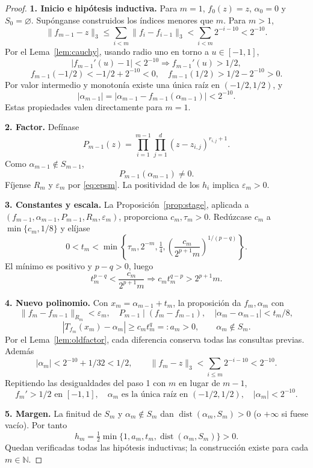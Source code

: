 \documentclass[11pt,a4paper]{article}
\numberwithin{equation}{section}
\theoremstyle{definition}
\theoremstyle{remark}
\newcommand{\N}{\mathbb N}
\DeclareMathOperator{\dist}{dist}
\newcommand{\paso}[1]{\par\smallskip\noindent\textbf{#1}\quad}
\begin{document}
\begin{proof}
\paso{1. Inicio e hipótesis inductiva.}
Para $m=1$, $f_0(z)=z$, $\alpha_0=0$ y $S_0=\varnothing$. Supónganse construidos los índices menores que $m$. Para $m>1$,
\[
\|f_{m-1}-z\|_3\le\sum_{i<m}\|f_i-f_{i-1}\|_3
<\sum_{i<m}2^{-i-10}<2^{-10}.
\]
Por el Lema~\ref{lem:cauchy}, usando radio uno en torno a $u\in[-1,1]$,
\[
|f_{m-1}'(u)-1|<2^{-10}\Longrightarrow f_{m-1}'(u)>1/2,
\]
\[
f_{m-1}(-1/2)<-1/2+2^{-10}<0,
\quad f_{m-1}(1/2)>1/2-2^{-10}>0.
\]
Por valor intermedio y monotonía existe una única raíz en $(-1/2,1/2)$, y
\[
|\alpha_{m-1}|=|\alpha_{m-1}-f_{m-1}(\alpha_{m-1})|<2^{-10}.
\]
Estas propiedades valen directamente para $m=1$.
\paso{2. Factor.}
Defínase
\begin{equation}\label{eq:Pm}
P_{m-1}(z)=\prod_{i=1}^{m-1}\prod_{j=1}^d(z-z_{i,j})^{r_{i,j}+1}.
\end{equation}
Como $\alpha_{m-1}\notin S_{m-1}$,
\[
P_{m-1}(\alpha_{m-1})\ne0.
\]
Fíjense $R_m$ y $\varepsilon_m$ por \eqref{eq:epsm}. La positividad de los $h_i$ implica $\varepsilon_m>0$.
\paso{3. Constantes y escala.}
La Proposición~\ref{prop:stage}, aplicada a $(f_{m-1},\alpha_{m-1},P_{m-1},R_m,\varepsilon_m)$, proporciona $c_m,\tau_m>0$. Redúzcase $c_m$ a $\min\{c_m,1/8\}$ y elíjase
\begin{equation}\label{eq:choose-tm}
0<t_m<\min\left\{\tau_m,2^{-m},\tfrac14,
\left(\frac{c_m}{2^{p+1}m}\right)^{1/(p-q)}\right\}.
\end{equation}
El mínimo es positivo y $p-q>0$, luego
\[
t_m^{p-q}<\frac{c_m}{2^{p+1}m}
\Longrightarrow c_mt_m^{q-p}>2^{p+1}m.
\]
\paso{4. Nuevo polinomio.}
Con $x_m=\alpha_{m-1}+t_m$, la proposición da $f_m,\alpha_m$ con
\[
\|f_m-f_{m-1}\|_{R_m}<\varepsilon_m,\quad
P_{m-1}\mid(f_m-f_{m-1}),\quad
|\alpha_m-\alpha_{m-1}|<t_m/8,
\]
\[
|T_{f_m}(x_m)-\alpha_m|\ge c_mt_m^q=:a_m>0,
\qquad \alpha_m\notin S_m.
\]
Por el Lema~\ref{lem:oldfactor}, cada diferencia conserva todas las consultas previas. Además
\[
|\alpha_m|<2^{-10}+1/32<1/2,\qquad
\|f_m-z\|_3<\sum_{i\le m}2^{-i-10}<2^{-10}.
\]
Repitiendo las desigualdades del paso 1 con $m$ en lugar de $m-1$,
\[
f_m'>1/2\text{ en }[-1,1],\quad
\alpha_m\text{ es la única raíz en }(-1/2,1/2),\quad |\alpha_m|<2^{-10}.
\]
\paso{5. Margen.}
La finitud de $S_m$ y $\alpha_m\notin S_m$ dan $\dist(\alpha_m,S_m)>0$ (o $+\infty$ si fuese vacío). Por tanto
\[
h_m=\tfrac12\min\{1,a_m,t_m,\dist(\alpha_m,S_m)\}>0.
\]
Quedan verificadas todas las hipótesis inductivas; la construcción existe para cada $m\in\N$.
\end{proof}
\end{document}
